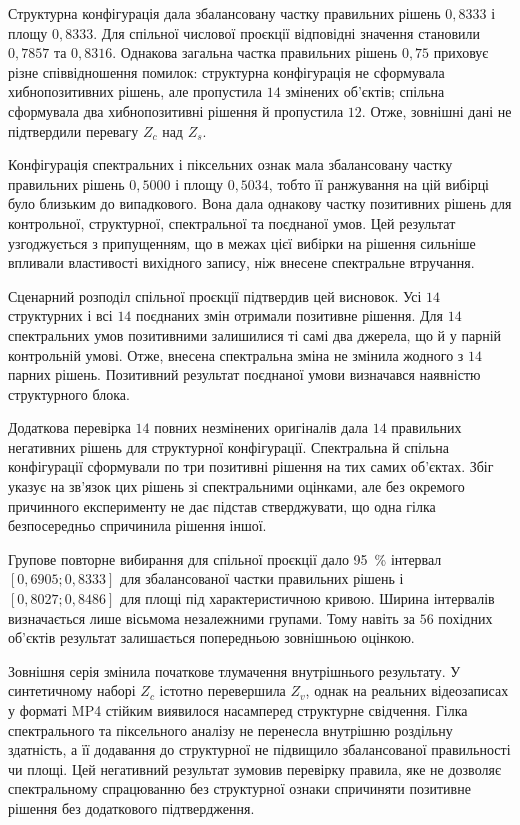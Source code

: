 Структурна конфігурація дала збалансовану частку правильних рішень $0{,}8333$ і площу $0{,}8333$. Для спільної числової проєкції відповідні значення становили $0{,}7857$ та $0{,}8316$. Однакова загальна частка правильних рішень $0{,}75$ приховує різне співвідношення помилок: структурна конфігурація не сформувала хибнопозитивних рішень, але пропустила $14$ змінених об’єктів; спільна сформувала два хибнопозитивні рішення й пропустила $12$. Отже, зовнішні дані не підтвердили перевагу $Z_c$ над $Z_s$.

Конфігурація спектральних і піксельних ознак мала збалансовану частку правильних рішень $0{,}5000$ і площу $0{,}5034$, тобто її ранжування на цій вибірці було близьким до випадкового. Вона дала однакову частку позитивних рішень для контрольної, структурної, спектральної та поєднаної умов. Цей результат узгоджується з припущенням, що в межах цієї вибірки на рішення сильніше впливали властивості вихідного запису, ніж внесене спектральне втручання.

Сценарний розподіл спільної проєкції підтвердив цей висновок. Усі $14$ структурних і всі $14$ поєднаних змін отримали позитивне рішення. Для $14$ спектральних умов позитивними залишилися ті самі два джерела, що й у парній контрольній умові. Отже, внесена спектральна зміна не змінила жодного з $14$ парних рішень. Позитивний результат поєднаної умови визначався наявністю структурного блока.

Додаткова перевірка $14$ повних незмінених оригіналів дала $14$ правильних негативних рішень для структурної конфігурації. Спектральна й спільна конфігурації сформували по три позитивні рішення на тих самих об’єктах. Збіг указує на зв’язок цих рішень зі спектральними оцінками, але без окремого причинного експерименту не дає підстав стверджувати, що одна гілка безпосередньо спричинила рішення іншої.

Групове повторне вибирання для спільної проєкції дало 95~\% інтервал $[0{,}6905;0{,}8333]$ для збалансованої частки правильних рішень і $[0{,}8027;0{,}8486]$ для площі під характеристичною кривою. Ширина інтервалів визначається лише вісьмома незалежними групами. Тому навіть за $56$ похідних об’єктів результат залишається попередньою зовнішньою оцінкою.

Зовнішня серія змінила початкове тлумачення внутрішнього результату. У синтетичному наборі $Z_c$ істотно перевершила $Z_v$, однак на реальних відеозаписах у форматі MP4 стійким виявилося насамперед структурне свідчення. Гілка спектрального та піксельного аналізу не перенесла внутрішню роздільну здатність, а її додавання до структурної не підвищило збалансованої правильності чи площі. Цей негативний результат зумовив перевірку правила, яке не дозволяє спектральному спрацюванню без структурної ознаки спричиняти позитивне рішення без додаткового підтвердження.

